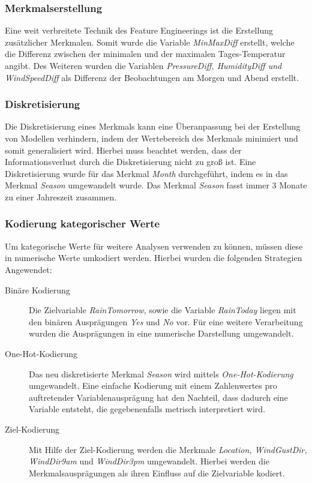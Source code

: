 \subsubsection{Merkmalserstellung}
Eine weit verbreitete Technik des Feature Engineerings ist die Erstellung zusätzlicher Merkmalen. Somit wurde die Variable \emph{MinMaxDiff} erstellt, welche die Differenz zwischen der minimalen und der maximalen Tages-Temperatur angibt. Des Weiteren wurden die Variablen \emph{PressureDiff, HumidityDiff und WindSpeedDiff} als Differenz der Beobachtungen am Morgen und Abend erstellt.

\subsubsection{Diskretisierung}
Die Diskretisierung eines Merkmals kann eine Überanpassung bei der Erstellung von Modellen verhindern, indem der Wertebereich des Merkmals minimiert und somit generalisiert wird. Hierbei muss beachtet werden, dass der Informationsverlust durch die Diskretisierung nicht zu groß ist. Eine Diskretisierung wurde für das Merkmal \emph{Month} durchgeführt, indem es in das Merkmal \emph{Season} umgewandelt wurde. Das Merkmal \emph{Season} fasst immer 3 Monate zu einer Jahreszeit zusammen.

\subsubsection{Kodierung kategorischer Werte}
Um kategorische Werte für weitere Analysen verwenden zu können, müssen diese in numerische Werte umkodiert werden. Hierbei wurden die folgenden Strategien Angewendet:
\begin{description}
	\item[Binäre Kodierung]
	Die Zielvariable \emph{RainTomorrow}, sowie die Variable \emph{RainToday} liegen mit den binären Ausprägungen \emph{Yes} und \emph{No} vor. Für eine weitere Verarbeitung wurden die Ausprägungen in eine numerische Darstellung umgewandelt.
	\item[One-Hot-Kodierung]
	Das neu diskretisierte Merkmal \emph{Season} wird mittels \emph{One-Hot-Kodierung} umgewandelt. Eine einfache Kodierung mit einem Zahlenwertes pro auftretender Variablenausprägung hat den Nachteil, dass dadurch eine Variable entsteht, die gegebenenfalls metrisch interpretiert wird.
	\item[Ziel-Kodierung]
	Mit Hilfe der Ziel-Kodierung werden die Merkmale \emph{Location, WindGustDir, WindDir9am} und \emph{WindDir3pm} umgewandelt. Hierbei werden die Merkmalsausprägungen als ihren Einfluss auf die Zielvariable kodiert.
\end{description}

